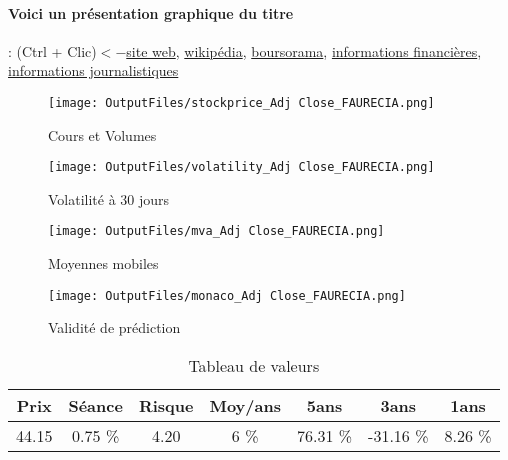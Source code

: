 \documentclass[11pt,a4paper]{report}%
\begin{document}
\paragraph{Voici un présentation graphique du titre} : (Ctrl + Clic)$<-$\href{https://www.faurecia.com/investisseurs-actionnaires}{site web}, \href{https://fr.wikipedia.org/wiki/Faurecia}{wikipédia}, \href{https://www.boursorama.com/cours/1rPEO}{boursorama}, \href{https://www.qwant.com/?q=site:https:%2f%2fwww.easybourse.com%2faction-societe%2fFAURECIA&t=web&client=ext-firefox-hp}{informations financières}, \href{https://bourse.lerevenu.com/cours-de-bourse/fiche-valeur-synthese/FAURECIA/EO-FR}{informations journalistiques}
\begin{figure}[!htb]
   \begin{minipage}{0.5\textwidth}
     \centering
     \texttt{[image: OutputFiles/stockprice\_Adj Close\_FAURECIA.png]}
     \caption{Cours et Volumes}\label{Fig:price_FAURECIA}
   \end{minipage}\hfill
   \begin{minipage}{0.5\textwidth}
     \centering
     \texttt{[image: OutputFiles/volatility\_Adj Close\_FAURECIA.png]}
     \caption{Volatilité à 30 jours}\label{Fig:volat_FAURECIA}
   \end{minipage}
\end{figure}
\begin{figure}[!htb]
   \begin{minipage}{0.5\textwidth}
     \centering
     \texttt{[image: OutputFiles/mva\_Adj Close\_FAURECIA.png]}
     \caption{Moyennes mobiles}\label{Fig:mva_FAURECIA}
   \end{minipage}\hfill
   \begin{minipage}{0.5\textwidth}
     \centering
     \texttt{[image: OutputFiles/monaco\_Adj Close\_FAURECIA.png]}
     \caption{Validité de prédiction}\label{Fig:prediction_FAURECIA}
   \end{minipage}
\end{figure}

\begin{table}[H]
  \centering
    \begin{tabular}{|c|c|c|c|c|c|c|}
    \hline
    Prix & Séance & Risque  & Moy/ans & 5ans & 3ans & 1ans \\
    \hline
    44.15 &    0.75 \%    & 4.20 & 6 \% & 76.31 \% & -31.16 \% & 8.26 \% \\
    \hline
    \end{tabular}%
        \label{tab:table_FAURECIA}%
      \caption{Tableau de valeurs}
\end{table}%
\end{document}
